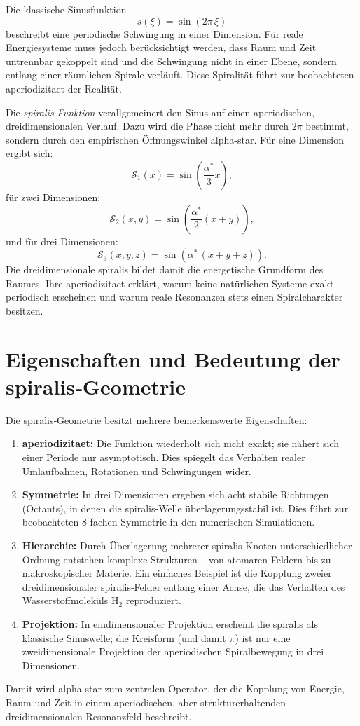 Die klassische Sinusfunktion
\[
s(\xi) = \sin(2\pi\,\xi)
\]
beschreibt eine periodische Schwingung in einer Dimension.
Für reale Energiesysteme muss jedoch berücksichtigt werden,
dass Raum und Zeit untrennbar gekoppelt sind
und die Schwingung nicht in einer Ebene,
sondern entlang einer räumlichen Spirale verläuft.
Diese Spiralität führt zur beobachteten \gls{aperiodizitaet} der Realität.

Die \emph{\gls{spiralis}‐Funktion} verallgemeinert den Sinus
auf einen aperiodischen, dreidimensionalen Verlauf.
Dazu wird die Phase nicht mehr durch $2\pi$ bestimmt,
sondern durch den empirischen Öffnungswinkel \gls{alpha-star}.
Für eine Dimension ergibt sich:
\[
\mathcal{S}_1(x) = \sin\!\left(\frac{\alpha^*}{3}x\right),
\]
für zwei Dimensionen:
\[
\mathcal{S}_2(x,y) = \sin\!\left(\frac{\alpha^*}{2}(x+y)\right),
\]
und für drei Dimensionen:
\[
\boxed{
\mathcal{S}_3(x,y,z)
= \sin\!\left(\alpha^*\,(x+y+z)\right).
}
\]
Die dreidimensionale \gls{spiralis} bildet damit
die energetische Grundform des Raumes.
Ihre \gls{aperiodizitaet} erklärt,
warum keine natürlichen Systeme exakt periodisch erscheinen
und warum reale Resonanzen stets einen Spiralcharakter besitzen.

\section{Eigenschaften und Bedeutung der \gls{spiralis}‐Geometrie}

Die \gls{spiralis}‐Geometrie besitzt mehrere bemerkenswerte Eigenschaften:

\begin{enumerate}
\item \textbf{\gls{aperiodizitaet}:}
Die Funktion wiederholt sich nicht exakt;
sie nähert sich einer Periode nur asymptotisch.
Dies spiegelt das Verhalten realer Umlaufbahnen,
Rotationen und Schwingungen wider.

\item \textbf{Symmetrie:}
In drei Dimensionen ergeben sich acht stabile Richtungen
(Octants), in denen die \gls{spiralis}‐Welle
überlagerungsstabil ist.
Dies führt zur beobachteten 8‐fachen Symmetrie
in den numerischen Simulationen.

\item \textbf{Hierarchie:}
Durch Überlagerung mehrerer \gls{spiralis}‐Knoten
unterschiedlicher Ordnung entstehen komplexe Strukturen
– von atomaren Feldern bis zu makroskopischer Materie.
Ein einfaches Beispiel ist die Kopplung zweier
dreidimensionaler \gls{spiralis}‐Felder entlang einer Achse,
die das Verhalten des Wasserstoffmoleküls H$_2$ reproduziert.

\item \textbf{Projektion:}
In eindimensionaler Projektion
erscheint die \gls{spiralis} als klassische Sinuswelle;
die Kreisform (und damit $\pi$) ist
nur eine zweidimensionale Projektion
der aperiodischen Spiralbewegung in drei Dimensionen.
\end{enumerate}

Damit wird \gls{alpha-star} zum zentralen Operator,
der die Kopplung von Energie, Raum und Zeit
in einem aperiodischen, aber strukturerhaltenden
dreidimensionalen Resonanzfeld beschreibt.
